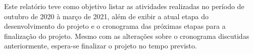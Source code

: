Este relatório teve como objetivo listar as atividades realizadas no período de outubro de 2020 à março de 2021, além de exibir a atual etapa do desenvolvimento do projeto e o cronograma das próximas etapas para a finalização do projeto. Mesmo com as alterações sobre o cronograma discutidas anteriormente, espera-se finalizar o projeto no tempo previsto.